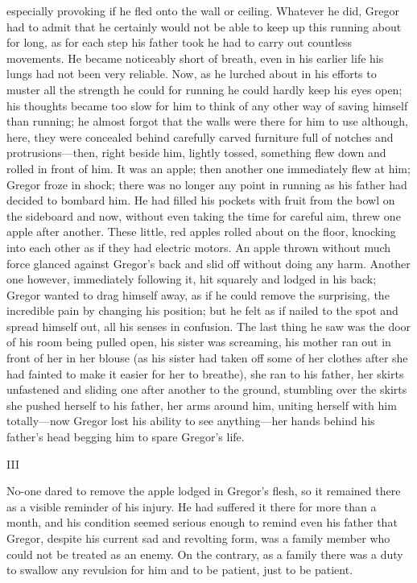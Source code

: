 especially provoking if he fled onto the wall or ceiling. Whatever he
did, Gregor had to admit that he certainly would not be able to keep up
this running about for long, as for each step his father took he had to
carry out countless movements. He became noticeably short of breath,
even in his earlier life his lungs had not been very reliable. Now, as
he lurched about in his efforts to muster all the strength he could for
running he could hardly keep his eyes open; his thoughts became too
slow for him to think of any other way of saving himself than running;
he almost forgot that the walls were there for him to use although,
here, they were concealed behind carefully carved furniture full of
notches and protrusions—then, right beside him, lightly tossed,
something flew down and rolled in front of him. It was an apple; then
another one immediately flew at him; Gregor froze in shock; there was
no longer any point in running as his father had decided to bombard
him. He had filled his pockets with fruit from the bowl on the
sideboard and now, without even taking the time for careful aim, threw
one apple after another. These little, red apples rolled about on the
floor, knocking into each other as if they had electric motors. An
apple thrown without much force glanced against Gregor’s back and slid
off without doing any harm. Another one however, immediately following
it, hit squarely and lodged in his back; Gregor wanted to drag himself
away, as if he could remove the surprising, the incredible pain by
changing his position; but he felt as if nailed to the spot and spread
himself out, all his senses in confusion. The last thing he saw was the
door of his room being pulled open, his sister was screaming, his
mother ran out in front of her in her blouse (as his sister had taken
off some of her clothes after she had fainted to make it easier for her
to breathe), she ran to his father, her skirts unfastened and sliding
one after another to the ground, stumbling over the skirts she pushed
herself to his father, her arms around him, uniting herself with him
totally—now Gregor lost his ability to see anything—her hands behind
his father’s head begging him to spare Gregor’s life.


\act III


No-one dared to remove the apple lodged in Gregor’s flesh, so it
remained there as a visible reminder of his injury. He had suffered it
there for more than a month, and his condition seemed serious enough to
remind even his father that Gregor, despite his current sad and
revolting form, was a family member who could not be treated as an
enemy. On the contrary, as a family there was a duty to swallow any
revulsion for him and to be patient, just to be patient.

